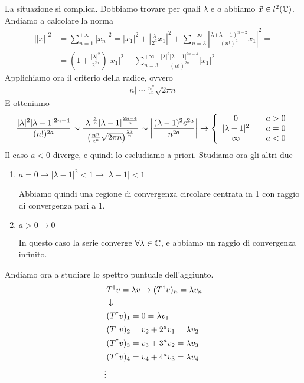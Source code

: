 \begin{enumerate}
	La situazione si complica. Dobbiamo trovare per quali $\lambda$ e $a$ abbiamo $\vec{x}\in l^2(\mathbb{C})$. Andiamo a calcolare la norma
	\begin{align}
		||x||^2 &= \sum_{n=1}^{+\infty} |x_n|^2 = |x_1|^2 + \left| \frac{\lambda}{2^a} x_1 \right|^2 + \sum_{n=3}^{+\infty} \left| \frac{\lambda(\lambda -1)^{n-2} }{(n!)^a} x_1 \right|^2 = \nonumber \\
		&= \left( 1 + \frac{|\lambda|^2}{2^{2a}} \right) |x_1|^2 + \sum_{n=3}^{+\infty}  \frac{|\lambda|^2|\lambda -1|^{2n-4} }{(n!)^{2a}} \left| x_1 \right|^2
	\end{align}
	Applichiamo ora il criterio della radice, ovvero
	\begin{align}
		n| \sim \frac{n^n}{e^n} \sqrt{2\pi n}
	\end{align}
	E otteniamo
	\begin{align}
		\frac{|\lambda|^2|\lambda -1|^{2n-4} }{(n!)^{2a}} \sim \frac{|\lambda|^\frac{2}{n}|\lambda -1|^\frac{{2n-4}}{n} }{\left(\frac{n^n}{e^n} \sqrt{2\pi n}\right)^\frac{2a}{n}} \sim \left| \frac{(\lambda -1)^2 e^{2a}}{n^{2a}} \right| \to \left\{ \begin{array}{ccc} 0 \quad &a>0\\ |\lambda -1|^2 \quad &a=0\\ \infty \quad &a<0 \end{array} \right.
	\end{align}
	Il caso $a<0$ diverge, e quindi lo escludiamo a priori. Studiamo ora gli altri due
	\begin{enumerate}
		\item $a = 0 \to |\lambda -1|^2<1 \to |\lambda -1| < 1$ 
		
		Abbiamo quindi una regione di convergenza circolare centrata in 1 con raggio di convergenza pari a 1.
		
		\item $a > 0 \to 0$
		
		In questo caso la serie converge $\forall \lambda \in \mathbb{C}$, e abbiamo un raggio di convergenza infinito.
	\end{enumerate}
	
\end{enumerate}

\newpage

Andiamo ora a studiare lo spettro puntuale dell'aggiunto.
\begin{align}
	&T^\dagger v = \lambda v \to (T^\dagger  v)_n = \lambda v_n\\ &\downarrow \nonumber \\
	&(T^\dagger  v)_1 = 0 = \lambda v_1\\
	&(T^\dagger  v)_2 = v_2 + 2^a v_1 = \lambda v_2\\
	&(T^\dagger  v)_3 = v_3 + 3^a v_2 = \lambda v_3\\
	&(T^\dagger  v)_4 = v_4 + 4^a v_3 = \lambda v_4\\
	\vdots \nonumber
\end{align}

